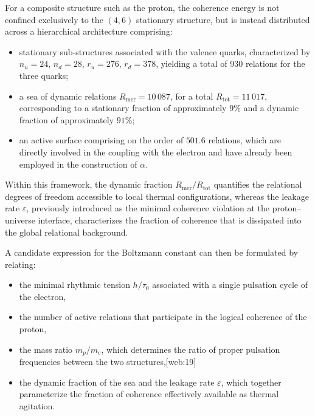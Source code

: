 \documentclass[11pt,a4paper]{article}
\begin{document}
For a composite structure such as the proton, the coherence energy is not confined exclusively to the \((4,6)\) stationary structure, but is instead distributed across a hierarchical architecture comprising:
\begin{itemize}[label=-]
  \item stationary sub‑structures associated with the valence quarks, characterized by \(n_u = 24\), \(n_d = 28\), \(r_u = 276\), \(r_d = 378\), yielding a total of 930 relations for the three quarks;
  \item a sea of dynamic relations \(R_{\mathrm{mer}} = 10\,087\), for a total \(R_{\mathrm{tot}} = 11\,017\), corresponding to a stationary fraction of approximately \(9\%\) and a dynamic fraction of approximately \(91\%\);
  \item an active surface comprising on the order of \(501.6\) relations, which are directly involved in the coupling with the electron and have already been employed in the construction of \(\alpha\).
\end{itemize}

Within this framework, the dynamic fraction \(R_{\mathrm{mer}}/R_{\mathrm{tot}}\) quantifies the relational degrees of freedom accessible to local thermal configurations, whereas the leakage rate \(\varepsilon\), previously introduced as the minimal coherence violation at the proton–universe interface, characterizes the fraction of coherence that is dissipated into the global relational background. 

A candidate expression for the Boltzmann constant can then be formulated by relating:
\begin{itemize}[label=-]
  \item the minimal rhythmic tension \(h/\tau_0\) associated with a single pulsation cycle of the electron,
  \item the number of active relations that participate in the logical coherence of the proton,
  \item the mass ratio \(m_p/m_e\), which determines the ratio of proper pulsation frequencies between the two structures,[web:19]
  \item the dynamic fraction of the sea and the leakage rate \(\varepsilon\), which together parameterize the fraction of coherence effectively available as thermal agitation.
\end{itemize}
\end{document}
